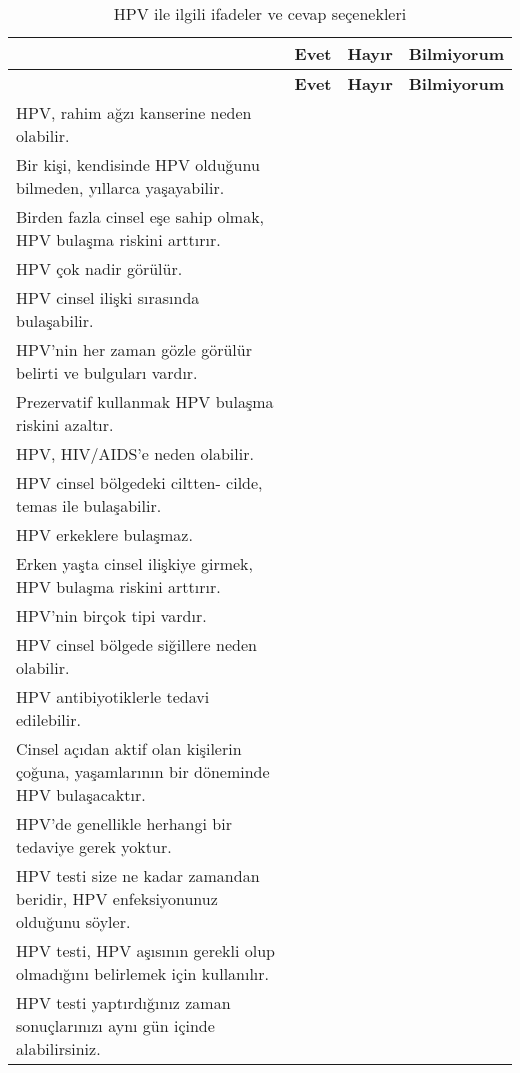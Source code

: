 \documentclass[turkish]{article}
\begin{document}
\begin{longtable}{|m{10cm}|c|c|c|}
    \caption{HPV ile ilgili ifadeler ve cevap seçenekleri} \label{tab:HPV} \\
    \hline
    & \textbf{Evet} & \textbf{Hayır} & \textbf{Bilmiyorum} \\
    \hline
    \endfirsthead
    \hline
    & \textbf{Evet} & \textbf{Hayır} & \textbf{Bilmiyorum} \\
    \hline
    \endhead
    \hline
    \endfoot
    \hline
    \endlastfoot
    HPV, rahim ağzı kanserine neden olabilir. & & & \\ \hline
    Bir kişi, kendisinde HPV olduğunu bilmeden, yıllarca yaşayabilir. & & & \\ \hline
    Birden fazla cinsel eşe sahip olmak, HPV bulaşma riskini arttırır. & & & \\ \hline
    HPV çok nadir görülür. & & & \\ \hline
    HPV cinsel ilişki sırasında bulaşabilir. & & & \\ \hline
    HPV’nin her zaman gözle görülür belirti ve bulguları vardır. & & & \\ \hline
    Prezervatif kullanmak HPV bulaşma riskini azaltır. & & & \\ \hline
    HPV, HIV/AIDS’e neden olabilir. & & & \\ \hline
    HPV cinsel bölgedeki ciltten- cilde, temas ile bulaşabilir. & & & \\ \hline
    HPV erkeklere bulaşmaz. & & & \\ \hline
    Erken yaşta cinsel ilişkiye girmek, HPV bulaşma riskini arttırır. & & & \\ \hline
    HPV’nin birçok tipi vardır. & & & \\ \hline
    HPV cinsel bölgede siğillere neden olabilir. & & & \\ \hline
    HPV antibiyotiklerle tedavi edilebilir. & & & \\ \hline
    Cinsel açıdan aktif olan kişilerin çoğuna, yaşamlarının bir döneminde HPV bulaşacaktır. & & & \\ \hline
    HPV’de genellikle herhangi bir tedaviye gerek yoktur. & & & \\ \hline
    HPV testi size ne kadar zamandan beridir, HPV enfeksiyonunuz olduğunu söyler. & & & \\ \hline
    HPV testi, HPV aşısının gerekli olup olmadığını belirlemek için kullanılır. & & & \\ \hline
    HPV testi yaptırdığınız zaman sonuçlarınızı aynı gün içinde alabilirsiniz. & & & \\ \hline

\end{longtable}
\end{document}
